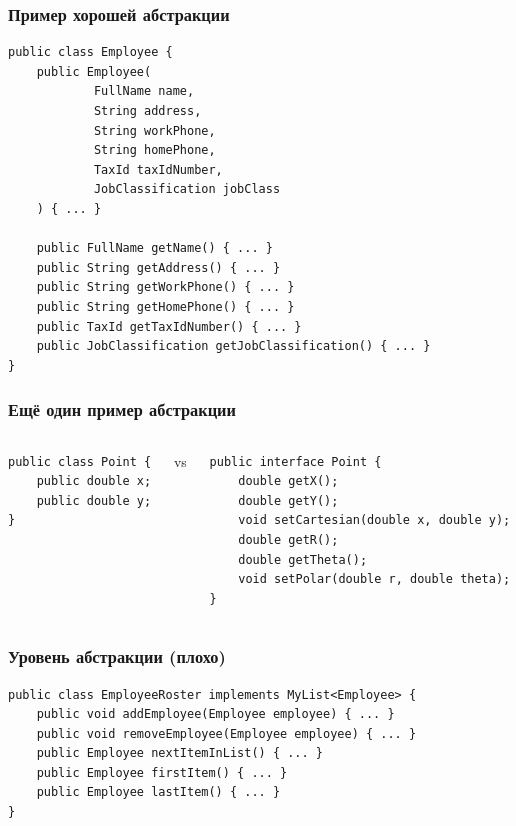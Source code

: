 \documentclass[xetex,mathserif,serif]{beamer}
\begin{document}
	\begin{frame}[fragile]
		\frametitle{Пример хорошей абстракции}
		\begin{footnotesize}
			\begin{verbatim}
public class Employee {
    public Employee(
            FullName name,
            String address,
            String workPhone,
            String homePhone,
            TaxId taxIdNumber,
            JobClassification jobClass
    ) { ... }

    public FullName getName() { ... }
    public String getAddress() { ... }
    public String getWorkPhone() { ... }
    public String getHomePhone() { ... }
    public TaxId getTaxIdNumber() { ... }
    public JobClassification getJobClassification() { ... }
}
			\end{verbatim}
		\end{footnotesize}
	\end{frame}

	\begin{frame}[fragile]
		\frametitle{Ещё один пример абстракции}
		\begin{columns}
			\begin{column}{0.32\textwidth}
				\begin{verbatim}
public class Point {
    public double x;
    public double y;
}
				\end{verbatim}
			\end{column}
			\begin{column}{0.05\textwidth}
				vs
			\end{column}
			\begin{column}{0.6\textwidth}
				\begin{verbatim}
public interface Point {
    double getX();
    double getY();
    void setCartesian(double x, double y);
    double getR();
    double getTheta();
    void setPolar(double r, double theta);
}
				\end{verbatim}
			\end{column}
		\end{columns}
	\end{frame}

	\begin{frame}[fragile]
		\frametitle{Уровень абстракции (плохо)}
		\begin{verbatim}
public class EmployeeRoster implements MyList<Employee> {
    public void addEmployee(Employee employee) { ... }
    public void removeEmployee(Employee employee) { ... }
    public Employee nextItemInList() { ... }
    public Employee firstItem() { ... }
    public Employee lastItem() { ... }
}
		\end{verbatim}
	\end{frame}
\end{document}
